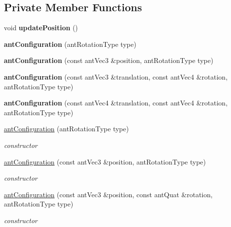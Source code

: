\subsection*{Private Member Functions}
\begin{DoxyCompactItemize}
\item 
\hypertarget{classant_configuration_a9c0a2725da1011439c3c3a093d3f9cc4}{void {\bfseries update\+Position} ()}\label{classant_configuration_a9c0a2725da1011439c3c3a093d3f9cc4}

\item 
\hypertarget{classant_configuration_a572b780d41fcc29ba89f8f43a719f1ae}{{\bfseries ant\+Configuration} (ant\+Rotation\+Type type)}\label{classant_configuration_a572b780d41fcc29ba89f8f43a719f1ae}

\item 
\hypertarget{classant_configuration_af4644bff29f1ff3f80b4ff049d23c7ab}{{\bfseries ant\+Configuration} (const ant\+Vec3 \&position, ant\+Rotation\+Type type)}\label{classant_configuration_af4644bff29f1ff3f80b4ff049d23c7ab}

\item 
\hypertarget{classant_configuration_ad93ac9487039d049a66373f0dc86b07c}{{\bfseries ant\+Configuration} (const ant\+Vec3 \&translation, const ant\+Vec4 \&rotation, ant\+Rotation\+Type type)}\label{classant_configuration_ad93ac9487039d049a66373f0dc86b07c}

\item 
\hypertarget{classant_configuration_ae63a7eef0f4033a624076ca380a177e2}{{\bfseries ant\+Configuration} (const ant\+Vec4 \&translation, const ant\+Vec4 \&rotation, ant\+Rotation\+Type type)}\label{classant_configuration_ae63a7eef0f4033a624076ca380a177e2}

\item 
\hyperlink{classant_configuration_a572b780d41fcc29ba89f8f43a719f1ae}{ant\+Configuration} (ant\+Rotation\+Type type)
\begin{DoxyCompactList}\small\item\em constructor \end{DoxyCompactList}\item 
\hyperlink{classant_configuration_af4644bff29f1ff3f80b4ff049d23c7ab}{ant\+Configuration} (const ant\+Vec3 \&position, ant\+Rotation\+Type type)
\begin{DoxyCompactList}\small\item\em constructor \end{DoxyCompactList}\item 
\hyperlink{classant_configuration_a9ae6717365bbf515218de0f858eaf193}{ant\+Configuration} (const ant\+Vec3 \&position, const ant\+Quat \&rotation, ant\+Rotation\+Type type)
\begin{DoxyCompactList}\small\item\em constructor \end{DoxyCompactList}\end{DoxyCompactItemize}
